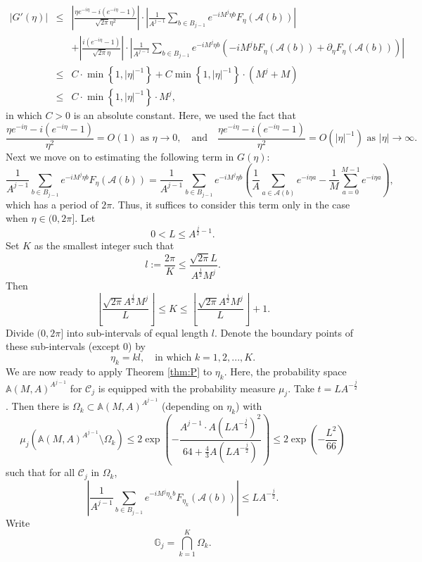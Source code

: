 \documentclass[12pt,reqno]{amsart}
\newcommand\Ab{\mathbb{A}}
\newcommand\Ac{\mathcal{A}}
\newcommand\Cc{\mathcal{C}}
\newcommand\Gb{\mathbb{G}}
\theoremstyle{plain}
\theoremstyle{remark}
\numberwithin{equation}{section}
\begin{document}
\begin{eqnarray*}
\left|G'(\eta)\right|&\le&\left|\frac{\eta e^{-i\eta}-i\left(e^{-i\eta}-1\right)}{\sqrt{2\pi}\eta^2}\right|\cdot\left|\frac{1}{A^{j-1}}\sum_{b\in B_{j-1}}e^{-iM^j\eta b}F_\eta\left(\Ac(b)\right)\right|\\
&&+\left|\frac{i\left(e^{-i\eta}-1\right)}{\sqrt{2\pi}\eta}\right|\cdot\left|\frac{1}{A^{j-1}}\sum_{b\in B_{j-1}}e^{-iM^j\eta b}\left(-iM^jbF_\eta\left(\Ac(b)\right)+\partial_\eta F_\eta\left(\Ac(b)\right)\right)\right|\\
&\le&C\cdot\min\left\{1,|\eta|^{-1}\right\}+C\min\left\{1,|\eta|^{-1}\right\}\cdot\left(M^j+M\right)\\
&\le&C\cdot\min\left\{1,|\eta|^{-1}\right\}\cdot M^j,
\end{eqnarray*}
in which $C>0$ is an absolute constant. Here, we used the fact that
$$\frac{\eta e^{-i\eta}-i\left(e^{-i\eta}-1\right)}{\eta^2}=O(1)\text{ as }\eta\to0,\quad\text{and}\quad\frac{\eta e^{-i\eta}-i\left(e^{-i\eta}-1\right)}{\eta^2}=O\left(|\eta|^{-1}\right)\text{ as }|\eta|\to\infty.$$
Next we move on to estimating the following term in $G(\eta)$:
$$\frac{1}{A^{j-1}}\sum_{b\in B_{j-1}}e^{-iM^j\eta b}F_\eta\left(\Ac(b)\right)=\frac{1}{A^{j-1}}\sum_{b\in B_{j-1}}e^{-iM^j\eta b}\left(\frac1A\sum_{a\in\Ac(b)}e^{-i\eta a}-\frac1M\sum_{a=0}^{M-1}e^{-i\eta a}\right),$$
which has a period of $2\pi$. Thus, it suffices to consider this term only in the case when $\eta\in(0,2\pi]$. Let 
$$0<L\le A^{\frac j2-1}.$$
Set $K$ as the smallest integer such that
$$l:=\frac{2\pi}{K}\le\frac{\sqrt{2\pi}L}{A^{\frac j2}M^j}.$$
Then
$$\left\lfloor\frac{\sqrt{2\pi}A^{\frac j2}M^j}{L}\right\rfloor\le K\le\left\lfloor\frac{\sqrt{2\pi}A^{\frac j2}M^j}{L}\right\rfloor+1.$$
Divide $(0,2\pi]$ into sub-intervals of equal length $l$. Denote the boundary points of these sub-intervals (except $0$) by
$$\eta_k=kl,\quad\text{in which }k=1,2,...,K.$$
We are now ready to apply Theorem \ref{thm:P} to $\eta_k$. Here, the probability space $\Ab(M,A)^{A^{j-1}}$ for $\Cc_j$ is equipped with the probability measure $\mu_j$. Take $t=LA^{-\frac j2}$. Then there is $\Omega_k\subset\Ab(M,A)^{A^{j-1}}$ (depending on $\eta_k$) with
$$\mu_j\left(\Ab(M,A)^{A^{j-1}}\setminus\Omega_k\right)\le2\exp\left(-\frac{A^{j-1}\cdot A\left(LA^{-\frac j2}\right)^2}{64+\frac43A\left(LA^{-\frac j2}\right)}\right)\le2\exp\left(-\frac{L^2}{66}\right)$$
such that for all $\Cc_j$ in $\Omega_k$,
$$\left|\frac{1}{A^{j-1}}\sum_{b\in B_{j-1}}e^{-iM^j\eta_k b}F_{\eta_k}\left(\Ac(b)\right)\right|\le LA^{-\frac j2}.$$
Write
\begin{equation}\label{eq:Gj}
\Gb_j=\bigcap_{k=1}^K\Omega_k.
\end{equation}
\end{document}
